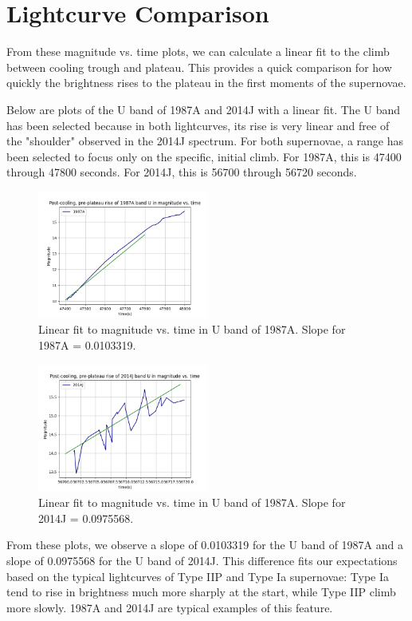 \section{Lightcurve Comparison}

From these magnitude vs. time plots, we can calculate a linear fit to the climb between cooling trough and plateau. This provides a quick comparison for how quickly the brightness rises to the plateau in the first moments of the supernovae.

Below are plots of the U band of 1987A and 2014J with a linear fit. The U band has been selected because in both lightcurves, its rise is very linear and free of the "shoulder" observed in the 2014J spectrum. For both supernovae, a range has been selected to focus only on the specific, initial climb. For 1987A, this is 47400 through 47800 seconds. For 2014J, this is 56700 through 56720 seconds.

\begin{figure}[htp]
	\includegraphics[width=0.5\textwidth]{1987A_U_linear.png}
	\caption{Linear fit to magnitude vs. time in U band of 1987A. Slope for 1987A = 0.0103319.}
\end{figure}

\begin{figure}[htp]
	\includegraphics[width=0.5\textwidth]{2014J_U_linear.png}
	\caption{Linear fit to magnitude vs. time in U band of 1987A. Slope for 2014J = 0.0975568.}
\end{figure}

From these plots, we observe a slope of 0.0103319 for the U band of 1987A and a slope of 0.0975568 for the U band of 2014J. This difference fits our expectations based on the typical lightcurves of Type IIP and Type Ia supernovae: Type Ia tend to rise in brightness much more sharply at the start, while Type IIP climb more slowly. 1987A and 2014J are typical examples of this feature.

